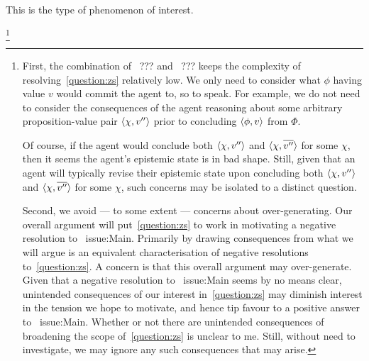 \begin{note}
  This is the type of phenomenon of interest.

  \footnote{
    First, the combination of~{\color{red} ???} and~{\color{red} ???} keeps the complexity of resolving~\autoref{question:zs} relatively low.
  We only need to consider what \(\phi\) having value \(v\) would commit the agent to, so to speak.
  For example, we do not need to consider the consequences of the agent reasoning about some arbitrary proposition-value pair \(\langle \chi, v'' \rangle\) prior to concluding \(\langle \phi, v \rangle\) from \(\Phi\).

  Of course, if the agent would conclude both \(\langle \chi, v'' \rangle\) and \(\langle \chi, \overline{v''} \rangle\) for some \(\chi\), then it seems the agent's epistemic state is in bad shape.
  Still, given that an agent will typically revise their epistemic state upon concluding both \(\langle \chi, v'' \rangle\) and \(\langle \chi, \overline{v''} \rangle\) for some \(\chi\), such concerns may be isolated to a distinct question.

  Second, we avoid --- to some extent --- concerns about over-generating.
  Our overall argument will put~\autoref{question:zs} to work in motivating a negative resolution to~{\color{red} issue:Main}.
  Primarily by drawing consequences from what we will argue is an equivalent characterisation of negative resolutions to~\autoref{question:zs}.
  A concern is that this overall argument may over-generate.
  Given that a negative resolution to~{\color{red} issue:Main} seems by no means clear, unintended consequences of our interest in~\autoref{question:zs} may diminish interest in the tension we hope to motivate, and hence tip favour to a positive answer to~{\color{red} issue:Main}.
  Whether or not there are unintended consequences of broadening the scope of~\autoref{question:zs} is unclear to me.
  Still, without need to investigate, we may ignore any such consequences that may arise.
  }
\end{note}

